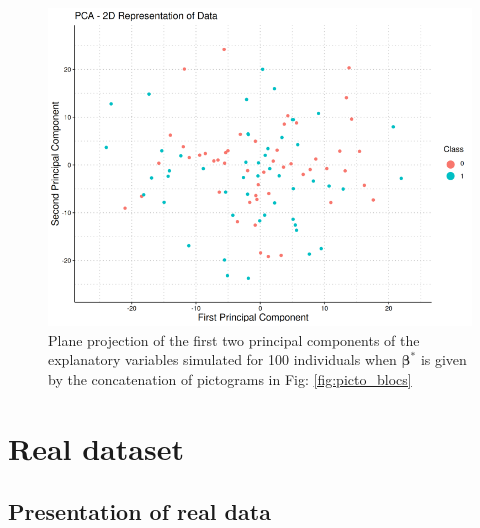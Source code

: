 \documentclass[preprint,12pt]{elsarticle}
\begin{document}
\begin{figure}[tbp]
    \centering
    \includegraphics[scale = 0.5]{./images/clusters.png}
    \caption{Plane projection of the first two principal components of the explanatory variables simulated for 100 individuals when $\bm{\beta}^*$ is given by the concatenation of pictograms in Fig: \ref{fig:picto_blocs}
    \label{fig:compos_plan}}
\end{figure}



\newpage

\section{Real dataset}
\label{sec:real_data}

\subsection{Presentation of real data}
\end{document}
